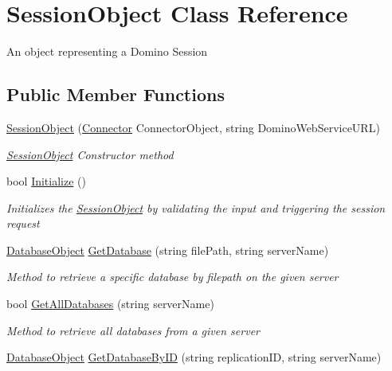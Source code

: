 \hypertarget{class_session_object}{}\section{Session\+Object Class Reference}
\label{class_session_object}


An object representing a Domino Session  


\subsection*{Public Member Functions}
\begin{DoxyCompactItemize}
\item 
\mbox{\hyperlink{class_session_object_a173822a7aec467880195d79a1bc9f520}{Session\+Object}} (\mbox{\hyperlink{class_connector}{Connector}} Connector\+Object, string Domino\+Web\+Service\+U\+RL)
\begin{DoxyCompactList}\small\item\em \mbox{\hyperlink{class_session_object}{Session\+Object}} Constructor method \end{DoxyCompactList}\item 
bool \mbox{\hyperlink{class_session_object_af3b9c9d56d98c848061952ed935f815b}{Initialize}} ()
\begin{DoxyCompactList}\small\item\em Initializes the \mbox{\hyperlink{class_session_object}{Session\+Object}} by validating the input and triggering the session request \end{DoxyCompactList}\item 
\mbox{\hyperlink{class_database_object}{Database\+Object}} \mbox{\hyperlink{class_session_object_aa4871ea2dac4215bef0274a2bd71ae72}{Get\+Database}} (string file\+Path, string server\+Name)
\begin{DoxyCompactList}\small\item\em Method to retrieve a specific database by filepath on the given server \end{DoxyCompactList}\item 
bool \mbox{\hyperlink{class_session_object_ae1dc8cf45f981c629d0f77fbff04ae66}{Get\+All\+Databases}} (string server\+Name)
\begin{DoxyCompactList}\small\item\em Method to retrieve all databases from a given server \end{DoxyCompactList}\item 
\mbox{\hyperlink{class_database_object}{Database\+Object}} \mbox{\hyperlink{class_session_object_ae53bad1d2fe161060ae409024b3e0de4}{Get\+Database\+By\+ID}} (string replication\+ID, string server\+Name)

\end{DoxyCompactItemize}
